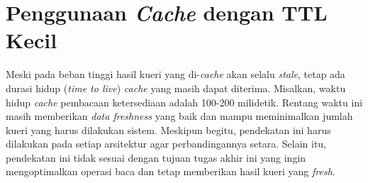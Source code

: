 \section{Penggunaan \textit{Cache} dengan TTL Kecil}

Meski pada beban tinggi hasil kueri yang di-\textit{cache} akan selalu \textit{stale}, tetap ada durasi hidup (\textit{time to live}) \textit{cache} yang masih dapat diterima. Misalkan, waktu hidup \textit{cache} pembacaan ketersediaan adalah 100-200 milidetik. Rentang waktu ini masih memberikan \textit{data freshness} yang baik dan mampu meminimalkan jumlah kueri yang harus dilakukan sistem. Meskipun begitu, pendekatan ini harus dilakukan pada setiap arsitektur agar perbandingannya setara. Selain itu, pendekatan ini tidak sesuai dengan tujuan tugas akhir ini yang ingin mengoptimalkan operasi baca dan tetap memberikan hasil kueri yang \textit{fresh}.